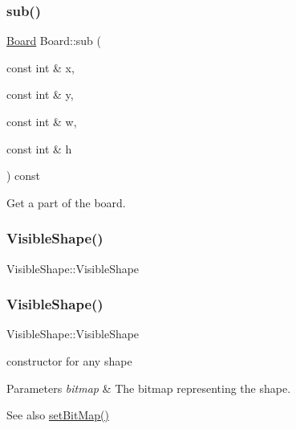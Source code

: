 \subsubsection{\texorpdfstring{sub()}{sub()}}
{\footnotesize\ttfamily \mbox{\hyperlink{class_board}{Board}} Board\+::sub (\begin{DoxyParamCaption}\item[{const int \&}]{x,  }\item[{const int \&}]{y,  }\item[{const int \&}]{w,  }\item[{const int \&}]{h }\end{DoxyParamCaption}) const\hspace{0.3cm}{\ttfamily [virtual]}}



Get a part of the board. 

\mbox{\label{class_board_a280deeca2a39d227887ff2e13b009c0a}} 
\subsubsection{\texorpdfstring{Visible\+Shape()}{VisibleShape()}\hspace{0.1cm}{\footnotesize\ttfamily [1/3]}}
{\footnotesize\ttfamily Visible\+Shape\+::\+Visible\+Shape}

\mbox{\label{class_board_a0efa89e218acbaeaf4f2453467d54cc9}} 
\subsubsection{\texorpdfstring{Visible\+Shape()}{VisibleShape()}\hspace{0.1cm}{\footnotesize\ttfamily [2/3]}}
{\footnotesize\ttfamily Visible\+Shape\+::\+Visible\+Shape}



constructor for any shape 


\begin{DoxyParams}{Parameters}
{\em bitmap} & The bitmap representing the shape. \\
\hline
\end{DoxyParams}
\begin{DoxySeeAlso}{See also}
\mbox{\hyperlink{class_shape_ae79ee483d0f48a426d1a544fd22fd8e5}{set\+Bit\+Map()}} 
\end{DoxySeeAlso}
\mbox{\label{class_board_adc9d11f72af8b96fdb379330fd9de592}} 
